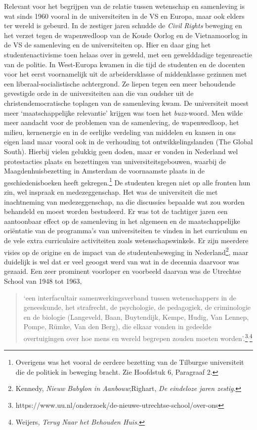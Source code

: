 \documentclass[smallauthor, chapterhaspagenum, nochapterinheader, pagenuminheader,  bigchapnum,medium2, tocpages, garamond, titleinheader]{jote-book}
\begin{document}
	Relevant voor het begrijpen van de relatie tussen wetenschap en samenleving is wat sinds 1960 vooral in de universiteiten in de VS en Europa, maar ook elders ter wereld is gebeurd. In de zestiger jaren schudde de \emph{Civil}\emph{ }\emph{Rights} beweging en het verzet tegen de wapenwedloop van de Koude Oorlog en de Vietnamoorlog in de VS de samenleving en de universiteiten op. Hier en daar ging het studentenactivisme toen helaas over in geweld, met een gewelddadige tegenreactie van de politie. In West-Europa kwamen in die tijd de studenten en de docenten voor het eerst voornamelijk uit de arbeidersklasse of middenklasse gezinnen met een liberaal-socialistische achtergrond. Ze liepen tegen een meer behoudende gevestigde orde in de universiteiten aan die van oudsher uit de christendemocratische toplagen van de samenleving kwam. De universiteit moest meer ‘maatschappelijke relevantie' krijgen was toen het \emph{buzz}-woord. Men wilde meer aandacht voor de problemen van de samenleving, de wapenwedloop, het milieu, kernenergie en in de eerlijke verdeling van middelen en kansen in ons eigen land maar vooral ook in de verhouding tot ontwikkelingslanden (The Global South). Hierbij vielen gelukkig geen doden, maar er vonden in Nederland wel protestacties plaats en bezettingen van universiteitsgebouwen, waarbij de Maagdenhuisbezetting in Amsterdam de voornaamste plaats in de geschiedenisboeken heeft gekregen.\footnote{Overigens was het vooral de eerdere bezetting van de Tilburgse universiteit die de politiek in beweging bracht. Zie Hoofdstuk 6, Paragraaf 2.} De studenten kregen niet op alle fronten hun zin, wel inspraak en medezeggenschap. Het was de universiteit die met inachtneming van medezeggenschap, na die discussies bepaalde wat zou worden behandeld en moest worden bestudeerd. Er was tot de tachtiger jaren een aantoonbaar effect op de samenleving in het algemeen en de maatschappelijke oriëntatie van de programma's van universiteiten te vinden in het curriculum en de vele extra curriculaire activiteiten zoals wetenschapswinkels. Er zijn meerdere visies op de origine en de impact van de studentenbeweging in Nederland\footnote{Kennedy, \emph{Nieuw Babylon in Aanbouw};Righart, \emph{De eindeloze jaren zestig}.}, maar duidelijk is wel dat er veel geoogst werd van wat in de decennia daarvoor was gezaaid. Een zeer prominent voorloper en voorbeeld daarvan was de Utrechtse School van 1948 tot 1963,

	\begin{quote}
		\itshape

		‘een interfacultair samenwerkingsverband tussen wetenschappers in de geneeskunde, het strafrecht, de psychologie, de pedagogiek, de criminologie en de biologie (Langeveld, Baan, Buytendijk, Kempe, Hudig, Van Lennep, Pompe, Rümke, Van den Berg), die elkaar vonden in gedeelde overtuigingen over hoe mens en wereld begrepen zouden moeten worden'.\footnote{https://www.uu.nl/onderzoek/de-nieuwe-utrechtse-school/over-ons}\textsuperscript{,}\footnote{Weijers, \emph{Terug Naar het Behouden Huis}\emph{.}}
	\end{quote}
\end{document}
